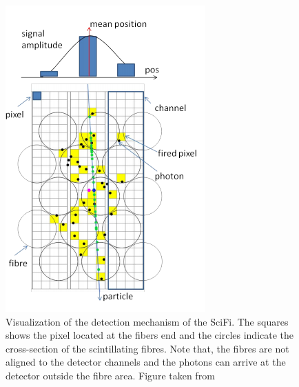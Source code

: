 \begin{figure}[!h]
\centering
\includegraphics[scale=0.5]{figures/SciFi_idea.PNG}
\caption{Visualization of the detection mechanism of the SciFi. The squares shows the pixel located at the fibers end and the circles indicate the cross-section of the scintillating fibres. Note that, the fibres are not aligned to the detector channels and the photons can arrive at the detector outside the fibre area.  Figure taken from \cite{upgrade_tracker_tdr}
\label{fig:SciFI_idea}}
\end{figure}

 